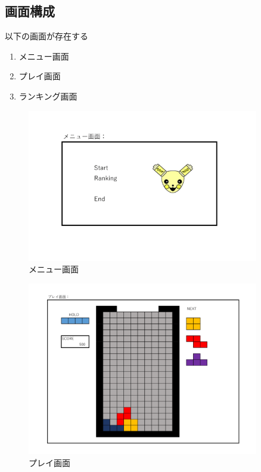 \documentclass[a4paper,11pt]{jsarticle}
\begin{document}
\subsection{画面構成}
以下の画面が存在する
\begin{enumerate}
\item メニュー画面
\item プレイ画面
\item ランキング画面
\end{enumerate}
\begin{figure}[H]
  \centering\includegraphics[clip,width=0.9\textwidth]{menu.png}
  \caption{メニュー画面}
  \label{menu}
\end{figure}
\begin{figure}[H]
  \centering\includegraphics[clip,width=0.9\textwidth]{play.png}
  \caption{プレイ画面}
  \label{play}
\end{figure}
\end{document}
